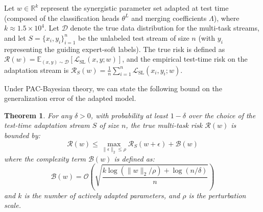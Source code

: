 \documentclass{article}
\newtheorem{theorem}{Theorem}
\begin{document}
Let $w \in \mathbb{R}^k$ represent the synergistic parameter set adapted at test time (composed of the classification heads $\theta^L$ and merging coefficients $\Lambda$), where $k \approx 1.5 \times 10^4$. Let $\mathcal{D}$ denote the true data distribution for the multi-task streams, and let $S = \{x_i, y_i\}_{i=1}^n$ be the unlabeled test stream of size $n$ (with $y_i$ representing the guiding expert-soft labels). The true risk is defined as $\mathcal{R}(w) = \mathbb{E}_{(x, y) \sim \mathcal{D}}[\mathcal{L}_{\text{SL}}(x, y; w)]$, and the empirical test-time risk on the adaptation stream is $\mathcal{R}_S(w) = \frac{1}{n}\sum_{i=1}^n \mathcal{L}_{\text{SL}}(x_i, y_i; w)$.

Under PAC-Bayesian theory, we can state the following bound on the generalization error of the adapted model.
\begin{theorem}
For any $\delta > 0$, with probability at least $1 - \delta$ over the choice of the test-time adaptation stream $S$ of size $n$, the true multi-task risk $\mathcal{R}(w)$ is bounded by:
\begin{equation}
    \mathcal{R}(w) \le \max_{\|\epsilon\|_2 \le \rho} \mathcal{R}_S(w + \epsilon) + \mathcal{B}(w)
\end{equation}
where the complexity term $\mathcal{B}(w)$ is defined as:
\begin{equation}
    \mathcal{B}(w) = \mathcal{O}\left( \sqrt{\frac{k \log( \|w\|_2 / \rho ) + \log(n/\delta)}{n}} \right)
\end{equation}
and $k$ is the number of actively adapted parameters, and $\rho$ is the perturbation scale.
\end{theorem}
\end{document}
